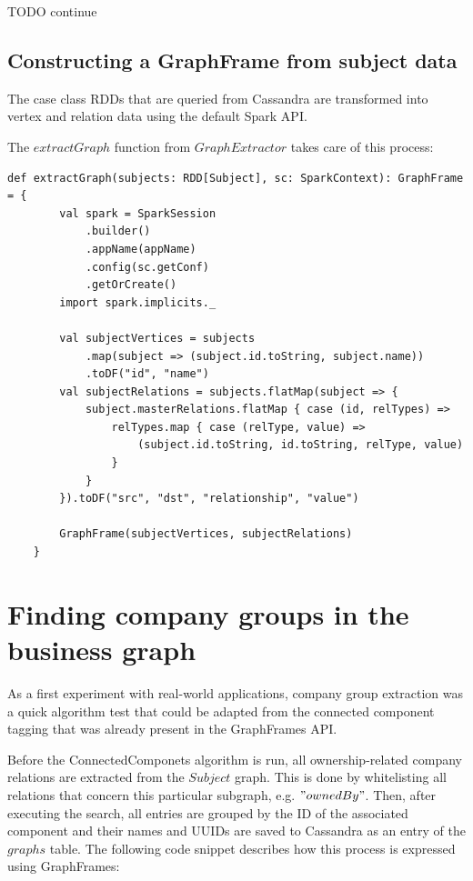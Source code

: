 \documentclass[
        a4paper,     %
        titlepage,   %
        oneside,     %
        parskip      %
        ]{scrartcl}  %
\begin{document}
    TODO continue

    \subsection{Constructing a GraphFrame from subject data}
    The case class RDDs that are queried from Cassandra are transformed into vertex
    and relation data using the default Spark API.

    The $extractGraph$ function from $GraphExtractor$ takes care of this process:

    \begin{lstlisting}[style=scalaStyle,caption=extractGraph in $GraphExtractor$]
    def extractGraph(subjects: RDD[Subject], sc: SparkContext): GraphFrame = {
  		val spark = SparkSession
  			.builder()
  			.appName(appName)
  			.config(sc.getConf)
  			.getOrCreate()
  		import spark.implicits._

  		val subjectVertices = subjects
  			.map(subject => (subject.id.toString, subject.name))
  			.toDF("id", "name")
  		val subjectRelations = subjects.flatMap(subject => {
  			subject.masterRelations.flatMap { case (id, relTypes) =>
  				relTypes.map { case (relType, value) =>
  					(subject.id.toString, id.toString, relType, value)
  				}
  			}
  		}).toDF("src", "dst", "relationship", "value")

  		GraphFrame(subjectVertices, subjectRelations)
  	}
    \end{lstlisting}

    \pagebreak

  \section{Finding company groups in the business graph}
  As a first experiment with real-world applications, company group extraction
  was a quick algorithm test that could be adapted from the connected component
  tagging that was already present in the GraphFrames API.

  Before the ConnectedComponets algorithm is run, all ownership-related company
  relations are extracted from the $Subject$ graph. This is done by whitelisting
  all relations that concern this particular subgraph, e.g. $"ownedBy"$.
  Then, after executing the search, all entries are grouped by the ID of the
  associated component and their names and UUIDs are saved to Cassandra
  as an entry of the $graphs$ table. The following code snippet describes how
  this process is expressed using GraphFrames:
\end{document}
